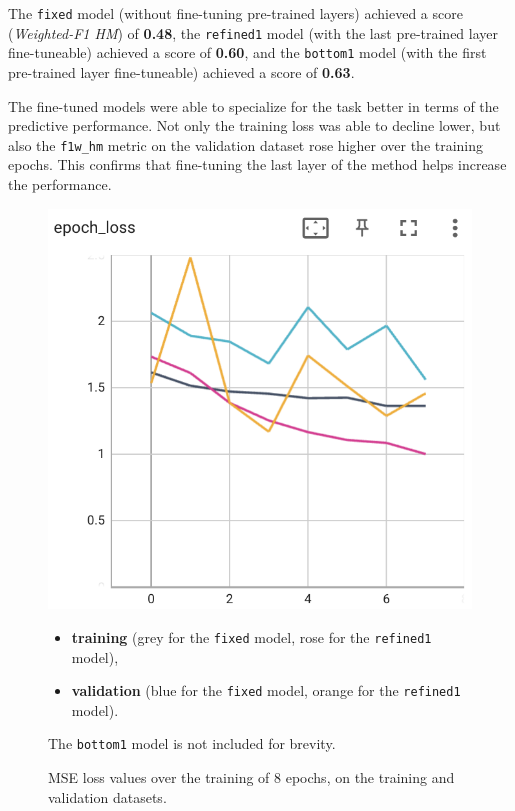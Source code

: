 The \texttt{fixed} model (without fine-tuning pre-trained layers) achieved a score (\textit{Weighted-F1 HM}) of \textbf{0.48}, the \texttt{refined1} model (with the last pre-trained layer fine-tuneable) achieved a score of \textbf{0.60}, and the \texttt{bottom1} model (with the first pre-trained layer fine-tuneable) achieved a score of \textbf{0.63}.

The fine-tuned models were able to specialize for the task better in terms of the predictive performance. Not only the training loss was able to decline lower, but also the \texttt{f1w\_hm} metric on the validation dataset rose higher over the training epochs.
This confirms that fine-tuning the last layer of the method helps increase the performance.

\begin{figure}
    \centering
    \begin{minipage}[c]{0.3\textwidth}
        \includegraphics[width=\textwidth]{images/distilbert_loss.png}
    \end{minipage}
    \begin{minipage}[c]{0.4\textwidth}
        \caption{MSE loss values over the training of 8 epochs, on the training and validation datasets.}\label{fig:p2t-loss}
        \begin{itemize}
            \item \textbf{training} (grey  for the \texttt{fixed} model, rose  for the \texttt{refined1} model),
            \item \textbf{validation} (blue  for the \texttt{fixed} model, orange  for the \texttt{refined1} model).
        \end{itemize}
        The \texttt{bottom1} model is not included for brevity.
    \end{minipage}
\end{figure}

